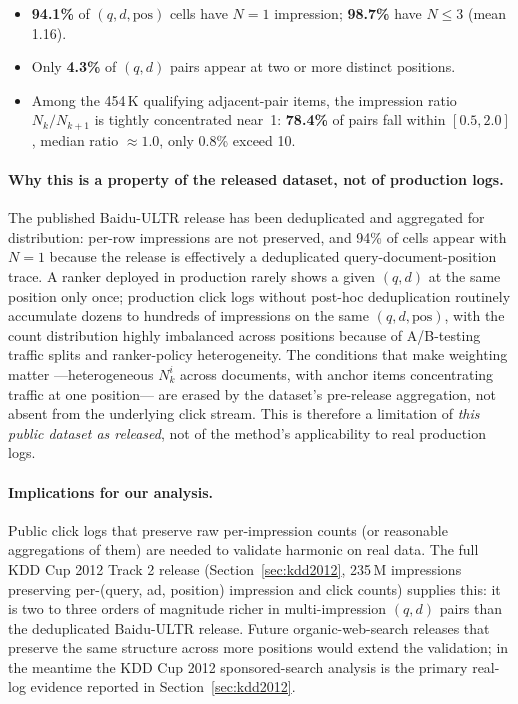 \documentclass[sigconf]{acmart}
\begin{document}
\begin{itemize}
  \item \textbf{94.1\%} of $(q, d, \mathrm{pos})$ cells have $N = 1$ impression; \textbf{98.7\%}
    have $N \leq 3$ (mean 1.16).
  \item Only \textbf{4.3\%} of $(q, d)$ pairs appear at two or more distinct positions.
  \item Among the 454\,K qualifying adjacent-pair items, the impression ratio $N_k / N_{k+1}$
    is tightly concentrated near~1: \textbf{78.4\%} of pairs fall within $[0.5, 2.0]$, median
    ratio $\approx 1.0$, only 0.8\% exceed 10.
\end{itemize}

\paragraph{Why this is a property of the released dataset, not of production logs.}
The published Baidu-ULTR release has been deduplicated and aggregated for distribution: per-row
impressions are not preserved, and 94\% of cells appear with $N=1$ because the release is
effectively a deduplicated query-document-position trace. A ranker deployed in production rarely
shows a given $(q,d)$ at the same position only once; production click logs without
post-hoc deduplication routinely accumulate dozens to hundreds of impressions on the same
$(q,d,\mathrm{pos})$, with the count distribution highly imbalanced across positions because
of A/B-testing traffic splits and ranker-policy heterogeneity. The conditions that make
weighting matter ---heterogeneous $N_k^i$ across documents, with anchor items concentrating
traffic at one position--- are erased by the dataset's pre-release aggregation, not absent
from the underlying click stream. This is therefore a limitation of \emph{this public dataset
as released}, not of the method's applicability to real production logs.

\paragraph{Implications for our analysis.}
Public click logs that preserve raw per-impression counts (or reasonable
aggregations of them) are needed to validate harmonic on real data. The full
KDD Cup 2012 Track 2 release (Section~\ref{sec:kdd2012}, 235\,M impressions
preserving per-(query, ad, position) impression and click counts) supplies this:
it is two to three orders of magnitude richer in multi-impression $(q,d)$ pairs
than the deduplicated Baidu-ULTR release. Future organic-web-search releases
that preserve the same structure across more positions would extend the validation;
in the meantime the KDD Cup 2012 sponsored-search analysis is the primary real-log
evidence reported in Section~\ref{sec:kdd2012}.
\end{document}
